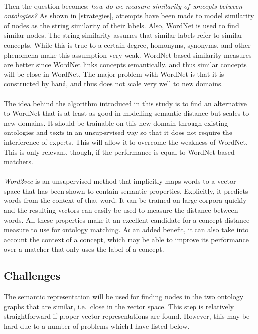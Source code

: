 \documentclass{article}
\begin{document}
 \paragraph{}
 Then the question becomes: \textit{how do we measure similarity of concepts between ontologies?} As shown in \ref{strategies}, attempts have been made to model similarity of nodes as the string similarity of their labels. Also, WordNet is used to find similar nodes. The string similarity assumes that similar labels refer to similar concepts. While this is true to a certain degree, homonyms, synonyms, and other phenomena make this assumption very weak. WordNet-based similarity measures are better since WordNet links concepts semantically, and thus similar concepts will be close in WordNet. The major problem with WordNet is that it is constructed by hand, and thus does not scale very well to new domains.
 \paragraph{}
 The idea behind the algorithm introduced in this study is to find an alternative to WordNet that is at least as good in modelling semantic distance but scales to new domains. It should be trainable on this new domain through existing ontologies and texts in an unsupervised way so that it does not require the interference of experts. This will allow it to overcome the weakness of WordNet. This is only relevant, though, if the performance is equal to WordNet-based matchers.
 \paragraph{}
 \emph{Word2vec} is an unsupervised method that implicitly maps words to a vector space that has been shown to contain semantic properties. Explicitly, it predicts words from the context of that word. %
 It can be trained on large corpora quickly and the resulting vectors can easily be used to measure the distance between words. All these properties make it an excellent candidate for a concept distance measure to use for ontology matching. As an added benefit, it can also take into account the context of a concept, which may be able to improve its performance over a matcher that only uses the label of a concept. 
 
 \subsection{Challenges}
 The semantic representation will be used for finding nodes in the two ontology graphs that are similar, i.e.\ close in the vector space. This step is relatively straightforward if proper vector representations are found. However, this may be hard due to a number of problems which I have listed below.
\end{document}
